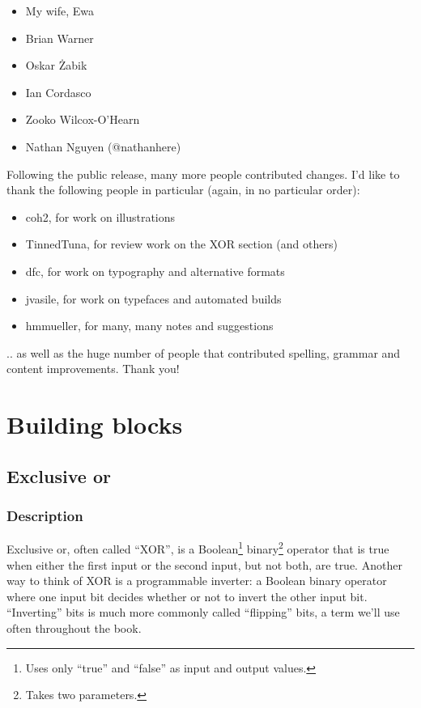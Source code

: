 \documentclass[11pt,ebook,table,dvipsnames]{memoir}
\begin{document}
\begin{itemize}
\item My wife, Ewa
\item Brian Warner
\item Oskar Żabik
\item Ian Cordasco
\item Zooko Wilcox-O'Hearn
\item Nathan Nguyen (@nathanhere)
\end{itemize}

Following the public release, many more people contributed changes.
I'd like to thank the following people in particular (again, in no
particular order):

\begin{itemize}
\item coh2, for work on illustrations
\item TinnedTuna, for review work on the XOR section (and others)
\item dfc, for work on typography and alternative formats
\item jvasile, for work on typefaces and automated builds
\item hmmueller, for many, many notes and suggestions
\end{itemize}

.. as well as the huge number of people that contributed spelling,
grammar and content improvements. Thank you!
\part{Building blocks}
\label{sec-2}
\chapter{Exclusive or}
\label{sec-2-1}
\section{Description}
\label{sec-2-1-1}
Exclusive or, often called \enquote{XOR}, is a Boolean\footnote{Uses only \enquote{true}
and \enquote{false} as input and output values.} binary\footnote{Takes two
parameters.} operator that is true when either the first input or the
second input, but not both, are true. Another way to think of XOR is a
programmable inverter: a Boolean binary operator where one input bit
decides whether or not to invert the other input bit. \enquote{Inverting} bits
is much more commonly called \enquote{flipping} bits, a term we'll use often
throughout the book.
\end{document}
